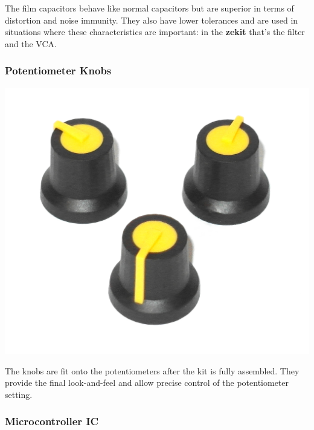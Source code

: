 \documentclass{scrartcl}
\begin{document}
The film capacitors behave like normal capacitors but are superior in terms of distortion and noise immunity. They also have lower tolerances and are used in situations where these characteristics are important: in the \textbf{zekit} that's the filter and the VCA.

\subsubsection{Potentiometer Knobs}

\begin{center}
    \includegraphics[scale=0.15]{assets/zekit-knobs.jpg}
\end{center}

The knobs are fit onto the potentiometers after the kit is fully assembled. They provide the final look-and-feel and allow precise control of the potentiometer setting.

\subsubsection{Microcontroller IC}
\end{document}
